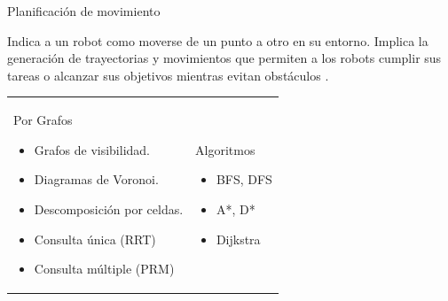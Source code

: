 \documentclass[
  24pt, %
  aspectratio=169, %
]{beamer}
\begin{document}
\begin{frame}{Planificación de movimiento}
  
  Indica a un robot como moverse de un punto a otro en su entorno. Implica la generación de trayectorias y movimientos que permiten a los robots cumplir sus tareas o alcanzar sus objetivos mientras evitan obstáculos \footnotemark.\\
  \bigskip %
  \addvspace{\medskipamount}
  \noindent
  \begin{tabularx}{\linewidth}{ @{} X X @{} }
    Por Grafos
    
    \begin{itemize}
    \item Grafos de visibilidad. 
    \item Diagramas de Voronoi.
    \item Descomposición por celdas.
    \item Consulta única (RRT)
    \item Consulta múltiple (PRM)
    \end{itemize} &

    Algoritmos
    
    \begin{itemize}
    \item BFS, DFS
    \item A*, D*
    \item Dijkstra
    \end{itemize}
  \end{tabularx}
\end{frame}
\end{document}
